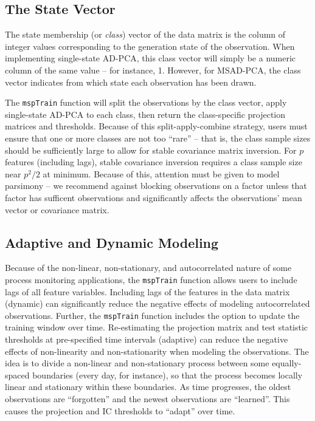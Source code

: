 \documentclass{report}\usepackage[]{graphicx}\usepackage[]{color}
\begin{document}
\subsection{The State Vector}
The state membership (or \emph{class}) vector of the data matrix is the column of integer values corresponding to the generation state of the observation. When implementing single-state AD-PCA, this class vector will simply be a numeric column of the same value -- for instance, 1. However, for MSAD-PCA, the class vector indicates from which state each observation has been drawn.

The \texttt{mspTrain} function will split the observations by the class vector, apply single-state AD-PCA to each class, then return the class-specific projection matrices and thresholds. Because of this split-apply-combine strategy, users must ensure that one or more classes are not too ``rare'' -- that is, the class sample sizes should be sufficiently large to allow for stable covariance matrix inversion. For $p$ features (including lags), stable covariance inversion requires a class sample size near $p ^ 2 / 2$ at minimum. Because of this, attention must be given to model parsimony -- we recommend against blocking observations on a factor unless that factor has sufficent observations and significantly affects the observations' mean vector or covariance matrix.


\subsection{Adaptive and Dynamic Modeling}
Because of the non-linear, non-stationary, and autocorrelated nature of some process monitoring applications, the \texttt{mspTrain} function allows users to include lags of all feature variables. Including lags of the features in the data matrix (dynamic) can significantly reduce the negative effects of modeling autocorrelated observations. Further, the \texttt{mspTrain} function includes the option to update the training window over time. Re-estimating the projection matrix and test statistic thresholds at pre-specified time intervals  (adaptive) can reduce the negative effects of non-linearity and non-stationarity when modeling the observations. The idea is to divide a non-linear and non-stationary process between some equally-spaced boundaries (every day, for instance), so that the process becomes locally linear and stationary within these boundaries. As time progresses, the oldest observations are ``forgotten'' and the newest observations are ``learned''. This causes the projection and IC thresholds to ``adapt'' over time.
\end{document}
